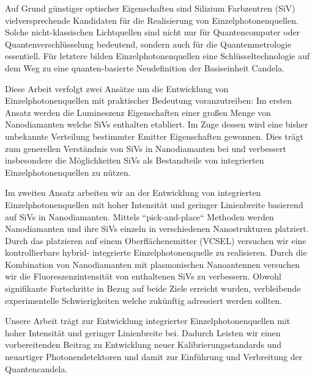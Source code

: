 	Auf Grund günstiger optischer Eigenschaften sind Silizium Farbzentren (SiV) vielversprechende Kandidaten für die Realisierung von Einzelphotonenquellen. Solche nicht-klassischen Lichtquellen sind nicht nur für Quantencomputer oder Quantenverschlüsselung bedeutend, sondern auch für die Quantenmetrologie essentiell. Für letztere bilden Einzelphotonenquellen eine Schlüsseltechnologie auf dem Weg zu eine quanten-basierte Neudefinition der Basiseinheit Candela.

	Diese Arbeit verfolgt zwei Ansätze um die Entwicklung von Einzelphotonenquellen mit praktischer Bedeutung voranzutreiben: Im ersten Ansatz werden die Lumineszenz Eigenschaften einer großen Menge von Nanodiamanten welche SiVs enthalten etabliert. Im Zuge dessen wird eine bisher unbekannte Verteilung bestimmter Emitter Eigenschaften gewonnen. Dies trägt zum generellen Verständnis von SiVs in Nanodiamanten bei und verbessert insbesondere die Möglichkeiten SiVs als Bestandteile von integrierten Einzelphotonenquellen zu nützen.

	Im zweiten Ansatz arbeiten wir an der Entwicklung von integrierten Einzelphotonenquellen mit hoher Intensität und geringer Linienbreite basierend auf SiVs in Nanodiamanten. Mittels “pick-and-place“ Methoden werden Nanodiamanten und ihre SiVs einzeln in verschiedenen Nanostrukturen platziert. Durch das platzieren auf einem Oberflächenemitter (VCSEL) versuchen wir eine kontrollierbare hybrid- integrierte Einzelphotonenquelle zu realisieren. Durch die Kombination von Nanodiamanten mit plasmonischen Nanoantennen versuchen wir die Fluoreszenzintensität von enthaltenen SiVs zu verbessern. Obwohl signifikante Fortschritte in Bezug auf beide Ziele erreicht wurden, verbleibende experimentelle Schwierigkeiten welche zukünftig adressiert werden sollten. 

	Unsere Arbeit trägt zur Entwicklung integrierter Einzelphotonenquellen mit hoher Intensität und geringer Linienbreite bei. Dadurch Leisten wir einen vorbereitenden Beitrag zu Entwicklung neuer Kalibrierungsstandards und neuartiger Photonendetektoren und damit zur Einführung und Verbreitung der Quantencandela. 

\vfill
